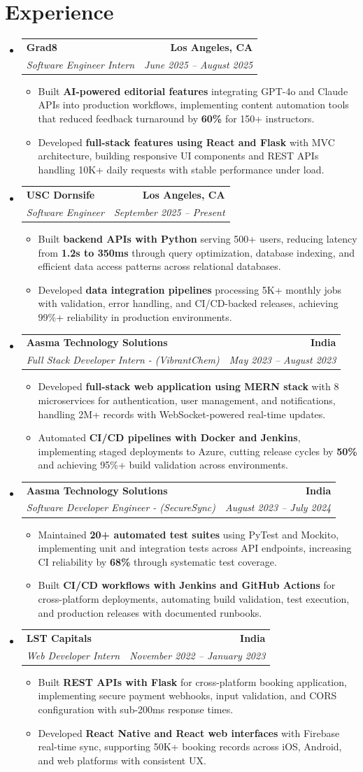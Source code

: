 \documentclass[letterpaper,10pt]{article}
\makeatletter
\newcommand{\resumeItem}[1]{\item\small{{#1 \vspace{-2pt}}}}
\newcommand{\resumeSubheading}[4]{\vspace{-1pt}\item\begin{tabular*}{1.0\textwidth}[t]{l@{\extracolsep{\fill}}r}\textbf{#1} & \textbf{\small #2} \\\textit{\small#3} & \textit{\small #4} \\\end{tabular*}\vspace{-2pt}}
\newcommand{\resumeSubHeadingListStart}{\begin{itemize}[leftmargin=0.0in, label={}]}
\newcommand{\resumeSubHeadingListEnd}{\end{itemize}}
\newcommand{\resumeItemListStart}{\begin{itemize}[leftmargin=0.15in,label=\textbullet,itemsep=2pt,topsep=0pt,parsep=0pt,partopsep=0pt]}
\newcommand{\resumeItemListEnd}{\end{itemize}\vspace{-4pt}}
\makeatother
\begin{document}
\section{Experience}
\resumeSubHeadingListStart
\resumeSubheading{Grad8}{Los Angeles, CA}{Software Engineer Intern}{June 2025 -- August 2025}
\resumeItemListStart
\resumeItem{Built \textbf{AI-powered editorial features} integrating GPT-4o and Claude APIs into production workflows, implementing content automation tools that reduced feedback turnaround by \textbf{60\%} for 150+ instructors.}
\resumeItem{Developed \textbf{full-stack features using React and Flask} with MVC architecture, building responsive UI components and REST APIs handling 10K+ daily requests with stable performance under load.}
\resumeItemListEnd
\resumeSubheading{USC Dornsife}{Los Angeles, CA}{Software Engineer}{September 2025 -- Present}
\resumeItemListStart
\resumeItem{Built \textbf{backend APIs with Python} serving 500+ users, reducing latency from \textbf{1.2s to 350ms} through query optimization, database indexing, and efficient data access patterns across relational databases.}
\resumeItem{Developed \textbf{data integration pipelines} processing 5K+ monthly jobs with validation, error handling, and CI/CD-backed releases, achieving 99\%+ reliability in production environments.}
\resumeItemListEnd
\resumeSubheading{Aasma Technology Solutions}{India}{Full Stack Developer Intern - (VibrantChem)}{May 2023 -- August 2023}
\resumeItemListStart
\resumeItem{Developed \textbf{full-stack web application using MERN stack} with 8 microservices for authentication, user management, and notifications, handling 2M+ records with WebSocket-powered real-time updates.}
\resumeItem{Automated \textbf{CI/CD pipelines with Docker and Jenkins}, implementing staged deployments to Azure, cutting release cycles by \textbf{50\%} and achieving 95\%+ build validation across environments.}
\resumeItemListEnd
\resumeSubheading{Aasma Technology Solutions}{India}{Software Developer Engineer - (SecureSync)}{August 2023 -- July 2024}
\resumeItemListStart
\resumeItem{Maintained \textbf{20+ automated test suites} using PyTest and Mockito, implementing unit and integration tests across API endpoints, increasing CI reliability by \textbf{68\%} through systematic test coverage.}
\resumeItem{Built \textbf{CI/CD workflows with Jenkins and GitHub Actions} for cross-platform deployments, automating build validation, test execution, and production releases with documented runbooks.}
\resumeItemListEnd
\resumeSubheading{LST Capitals}{India}{Web Developer Intern}{November 2022 -- January 2023}
\resumeItemListStart
\resumeItem{Built \textbf{REST APIs with Flask} for cross-platform booking application, implementing secure payment webhooks, input validation, and CORS configuration with sub-200ms response times.}
\resumeItem{Developed \textbf{React Native and React web interfaces} with Firebase real-time sync, supporting 50K+ booking records across iOS, Android, and web platforms with consistent UX.}
\resumeItemListEnd
\resumeSubHeadingListEnd
\vspace{-14pt}
\end{document}
